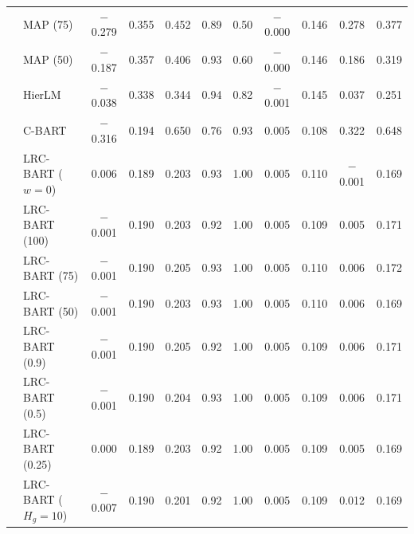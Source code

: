 \documentclass[11pt]{article}
\theoremstyle{definition}
\theoremstyle{plain}
\begin{document}
\begin{center}
\begin{longtable}{llccccccccc}
& MAP (75) & $-$0.279 & 0.355 & 0.452 & 0.89 & 0.50 & $-$0.000 & 0.146 & 0.278 & 0.377 \\
& MAP (50) & $-$0.187 & 0.357 & 0.406 & 0.93 & 0.60 & $-$0.000 & 0.146 & 0.186 & 0.319 \\
& HierLM & $-$0.038 & 0.338 & 0.344 & 0.94 & 0.82 & $-$0.001 & 0.145 & 0.037 & 0.251 \\
& C-BART & $-$0.316 & 0.194 & 0.650 & 0.76 & 0.93 & 0.005 & 0.108 & 0.322 & 0.648 \\
& LRC-BART ($w=0$) & 0.006 & 0.189 & 0.203 & 0.93 & 1.00 & 0.005 & 0.110 & $-$0.001 & 0.169 \\
& LRC-BART (100) & $-$0.001 & 0.190 & 0.203 & 0.92 & 1.00 & 0.005 & 0.109 & 0.005 & 0.171 \\
& LRC-BART (75) & $-$0.001 & 0.190 & 0.205 & 0.93 & 1.00 & 0.005 & 0.110 & 0.006 & 0.172 \\
& LRC-BART (50) & $-$0.001 & 0.190 & 0.203 & 0.93 & 1.00 & 0.005 & 0.110 & 0.006 & 0.169 \\
& LRC-BART (0.9) & $-$0.001 & 0.190 & 0.205 & 0.92 & 1.00 & 0.005 & 0.109 & 0.006 & 0.171 \\
& LRC-BART (0.5) & $-$0.001 & 0.190 & 0.204 & 0.93 & 1.00 & 0.005 & 0.109 & 0.006 & 0.171 \\
& LRC-BART (0.25) & 0.000 & 0.189 & 0.203 & 0.92 & 1.00 & 0.005 & 0.109 & 0.005 & 0.169 \\
& LRC-BART ($H_g=10$) & $-$0.007 & 0.190 & 0.201 & 0.92 & 1.00 & 0.005 & 0.109 & 0.012 & 0.169 \\
\end{longtable}
\end{center}
\end{document}
